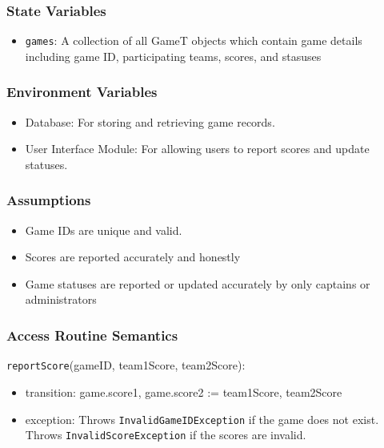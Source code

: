 \documentclass[12pt, titlepage]{article}
\begin{document}
\subsubsection{State Variables}

\begin{itemize}
  \item \texttt{games}: A collection of all GameT objects which contain game details including game ID, participating teams, scores, and stasuses
\end{itemize}

\subsubsection{Environment Variables}

\begin{itemize}
  \item Database: For storing and retrieving game records.
  \item User Interface Module: For allowing users to report scores and update statuses.
\end{itemize}

\subsubsection{Assumptions}

\begin{itemize}
  \item Game IDs are unique and valid.
  \item Scores are reported accurately and honestly
  \item Game statuses are reported or updated accurately by only captains or administrators
\end{itemize}

\subsubsection{Access Routine Semantics}

\noindent \texttt{reportScore}(gameID, team1Score, team2Score):
\begin{itemize}
  \item transition: game.score1, game.score2 := team1Score, team2Score
  \item exception: Throws \texttt{InvalidGameIDException} if the game does not exist. Throws \texttt{InvalidScoreException} if the scores are invalid.
\end{itemize}
\end{document}
